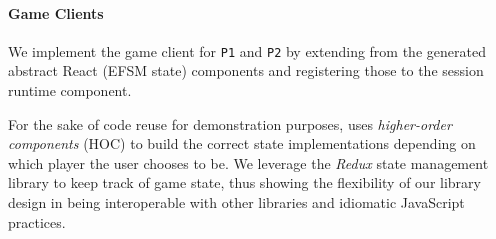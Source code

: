 \paragraph{Game Clients}
We implement the game client for \texttt{P1} and
\texttt{P2} by extending from the generated abstract React (EFSM state)
components and registering those to the session runtime component.

For the sake of code reuse for demonstration purposes, \cite{NoughtsAndCrosses}
uses \textit{higher-order components} (HOC) to build the correct state
implementations depending on which player the user chooses to be.
We leverage the \textit{Redux} \cite{Redux} state management library to keep track of game
state, thus showing the flexibility of our library design in being
interoperable with other libraries and idiomatic JavaScript practices.

